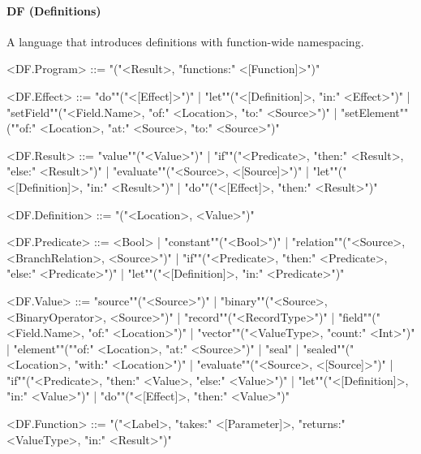 \documentclass[main.tex]{subfiles}
\begin{document}
\paragraph{ DF (Definitions) } A language that introduces definitions with function-wide namespacing.
\begin{grammar}
	\footnotesize
				<DF.Program> ::=
							"("<Result>, "functions:" <[Function]>")"
				\par
				<DF.Effect> ::=
						"do""("<[Effect]>")"
						| "let""("<[Definition]>, "in:" <Effect>")"
						| "setField""("<Field.Name>, "of:" <Location>, "to:" <Source>")"
						| "setElement""(""of:" <Location>, "at:" <Source>, "to:" <Source>")"
				\par
				<DF.Result> ::=
						"value""("<Value>")"
						| "if""("<Predicate>, "then:" <Result>, "else:" <Result>")"
						| "evaluate""("<Source>, <[Source]>")"
						| "let""("<[Definition]>, "in:" <Result>")"
						| "do""("<[Effect]>, "then:" <Result>")"
				\par
				<DF.Definition> ::=
							"("<Location>, <Value>")"
				\par
				<DF.Predicate> ::=
						<Bool> |
						"constant""("<Bool>")"
						| "relation""("<Source>, <BranchRelation>, <Source>")"
						| "if""("<Predicate>, "then:" <Predicate>, "else:" <Predicate>")"
						| "let""("<[Definition]>, "in:" <Predicate>")"
				\par
				<DF.Value> ::=
						"source""("<Source>")"
						| "binary""("<Source>, <BinaryOperator>, <Source>")"
						| "record""("<RecordType>")"
						| "field""("<Field.Name>, "of:" <Location>")"
						| "vector""("<ValueType>, "count:" <Int>")"
						| "element""(""of:" <Location>, "at:" <Source>")"
						| "seal"
						| "sealed""("<Location>, "with:" <Location>")"
						| "evaluate""("<Source>, <[Source]>")"
						| "if""("<Predicate>, "then:" <Value>, "else:" <Value>")"
						| "let""("<[Definition]>, "in:" <Value>")"
						| "do""("<[Effect]>, "then:" <Value>")"
				\par
				<DF.Function> ::=
							"("<Label>, "takes:" <[Parameter]>, "returns:" <ValueType>, "in:" <Result>")"
				\par
\end{grammar}
\par
\end{document}
